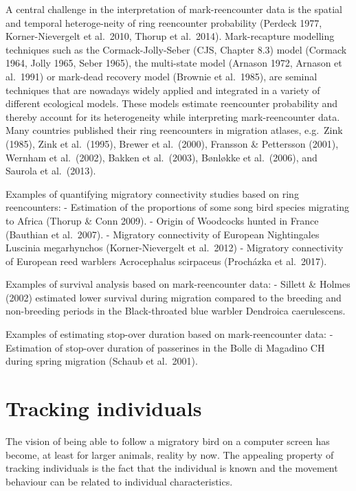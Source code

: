 \documentclass[
]{book}
\begin{document}
A central challenge in the interpretation of mark-reencounter data is the spatial and temporal heteroge-neity of ring reencounter probability (Perdeck 1977, Korner-Nievergelt et al.~2010, Thorup et al.~2014). Mark-recapture modelling techniques such as the Cormack-Jolly-Seber (CJS, Chapter 8.3) model (Cormack 1964, Jolly 1965, Seber 1965), the multi-state model (Arnason 1972, Arnason et al.~1991) or mark-dead recovery model (Brownie et al.~1985), are seminal techniques that are nowadays widely applied and integrated in a variety of different ecological models. These models estimate reencounter probability and thereby account for its heterogeneity while interpreting mark-reencounter data.\\
Many countries published their ring reencounters in migration atlases, e.g.~Zink (1985), Zink et al.~(1995), Brewer et al.~(2000), Fransson \& Pettersson (2001), Wernham et al.~(2002), Bakken et al.~(2003), Bønløkke et al.~(2006), and Saurola et al.~(2013).

Examples of quantifying migratory connectivity studies based on ring reencounters:
- Estimation of the proportions of some song bird species migrating to Africa (Thorup \& Conn 2009).
- Origin of Woodcocks hunted in France (Bauthian et al.~2007).
- Migratory connectivity of European Nightingales Luscinia megarhynchos (Korner-Nievergelt et al.~2012)
- Migratory connectivity of European reed warblers Acrocephalus scirpaceus (Procházka et al.~2017).

Examples of survival analysis based on mark-reencounter data:
- Sillett \& Holmes (2002) estimated lower survival during migration compared to the breeding and non-breeding periods in the Black-throated blue warbler Dendroica caerulescens.

Examples of estimating stop-over duration based on mark-reencounter data:
- Estimation of stop-over duration of passerines in the Bolle di Magadino CH during spring migration (Schaub et al.~2001).

\hypertarget{tracking-individuals}{%
\section{Tracking individuals}\label{tracking-individuals}}

The vision of being able to follow a migratory bird on a computer screen has become, at least for larger animals, reality by now. The appealing property of tracking individuals is the fact that the individual is known and the movement behaviour can be related to individual characteristics.
\end{document}
